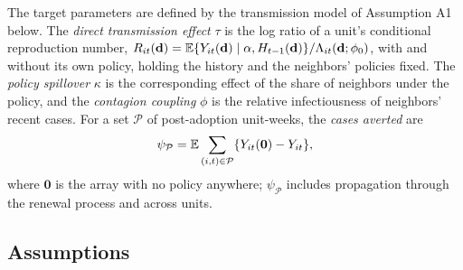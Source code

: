 The target parameters are defined by the transmission model of Assumption A1 below. The
\emph{direct transmission effect} $\tau$ is the log ratio of a unit's conditional reproduction
number, $R_{it}(\mathbf d)=\mathbb{E}\{Y_{it}(\mathbf d)\mid\alpha,H_{t-1}(\mathbf d)\}/\Lambda_{it}(\mathbf d;\phi_0)$,
with and without its own policy, holding the history and the neighbors' policies fixed. The
\emph{policy spillover} $\kappa$ is the corresponding effect of the share of neighbors under the
policy, and the \emph{contagion coupling} $\phi$ is the relative infectiousness of neighbors'
recent cases. For a set $\mathcal P$ of post-adoption unit-weeks, the \emph{cases averted} are
\begin{equation}
\psi_{\mathcal P}=\mathbb{E}\sum_{(i,t)\in\mathcal P}\{Y_{it}(\mathbf 0)-Y_{it}\},
\label{eq:psi}
\end{equation}
where $\mathbf 0$ is the array with no policy anywhere; $\psi_{\mathcal P}$ includes propagation
through the renewal process and across units.

\subsection{Assumptions}


